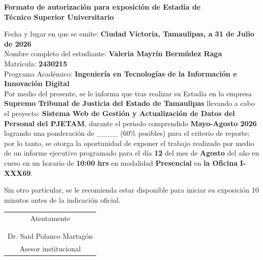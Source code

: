 \documentclass[12pt]{article}
\newcommand{\NombreAlumno}{Valeria Mayrín Bermúdez Raga}
\newcommand{\NombreProyecto}{Sistema Web de Gestión y Actualización de Datos del Personal del PJETAM}
\newcommand{\UnidadEconomica}{Supremo Tribunal de Justicia del Estado de Tamaulipas}
\newcommand{\nasesorinstitucional}{Dr. Said Polanco Martagón}
\newcommand{\Matricula}           {2430215}  %
\newcommand{\ncuatrimestre}{Mayo-Agosto 2026}
\newcommand{\fechaAutorizacionInforme}               {31 de Julio de 2026}
\newcommand{\DiaEvaluacionPesentacion}{12}
\newcommand{\MesEvaluacionPesentacion}{Agosto}
\newcommand{\HoraEvaluacionPesentacion}{10:00 hrs}
\newcommand{\modalidadEvaluacionPesentacion}{Presencial} %
\newcommand{\tipoAulaOficinaEnlacePesentacion}{la Oficina} %
\newcommand{\AulaEvaluacionOEnlaceMeetPesentacion}{I-XXX69} %
\newcommand{\ncarrera}            {Ingeniería en Tecnologías de la Información e Innovación Digital}
\begin{document}
\begin{center}
{\Large \textbf{Formato de autorización para exposición de Estadía de}}\\[0.125cm]
{\Large \textbf{Técnico Superior Universitario}}\\[0.25cm]
\end{center}

\noindent
Fecha y lugar en que se emite: \textbf{Ciudad Victoria, Tamaulipas, a \fechaAutorizacionInforme } \\[0.125cm]
Nombre completo del estudiante: \textbf{\NombreAlumno} \\[0.125cm]
Matrícula: \textbf{\Matricula}  \\[0.125cm]
Programa Académico: \textbf{\ncarrera}  \\[0.25cm]

\noindent
Por medio del presente, se le informa que tras realizar su Estadía en la empresa \textbf{\UnidadEconomica} llevando a cabo el proyecto: \textbf{\NombreProyecto}, durante el periodo comprendido \textbf{\ncuatrimestre} logrando una ponderación de \_\_\_\_  (60\% posibles) para el criterio de reporte; por lo tanto, se otorga la oportunidad de exponer el trabajo realizado por medio de un informe ejecutivo programado para el día \textbf{\DiaEvaluacionPesentacion} del mes de \textbf{\MesEvaluacionPesentacion} del año en curso en un horario de \textbf{\HoraEvaluacionPesentacion} en modalidad \textbf{\modalidadEvaluacionPesentacion} en \textbf{\tipoAulaOficinaEnlacePesentacion} \textbf{\AulaEvaluacionOEnlaceMeetPesentacion}.

\vspace{0.25cm}

\noindent
Sin otro particular, se le recomienda estar disponible para iniciar su exposición 10 minutos antes de la indicación oficial.

\vspace{0.5cm}

\begin{center}
\begin{tabular}{p{10cm}}
\multicolumn{1}{c}{Atentamente}   \\
 \\
 \\ \hline
\multicolumn{1}{c}{\nasesorinstitucional}   \\
\multicolumn{1}{c}{Asesor institucional}   \\
\end{tabular}
\end{center}
\end{document}
